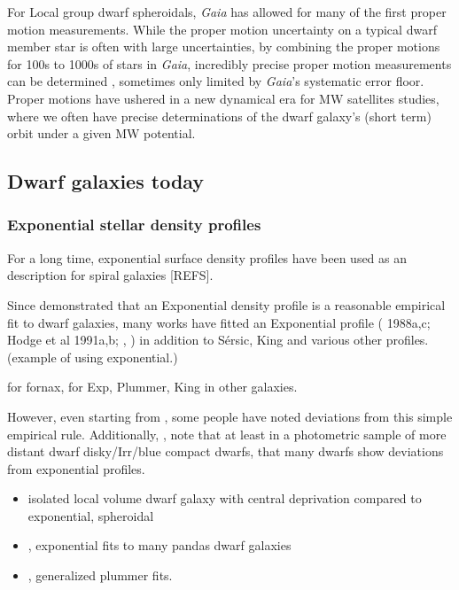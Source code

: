 For Local group dwarf spheroidals, \emph{Gaia} has allowed for many of
the first proper motion measurements. While the proper motion
uncertainty on a typical dwarf member star is often with large
uncertainties, by combining the proper motions for 100s to 1000s of
stars in \emph{Gaia}, incredibly precise proper motion measurements can
be determined \citep[e.g.][]{MV2020a}, sometimes only limited by
\emph{Gaia}'s systematic error floor. Proper motions have ushered in a
new dynamical era for MW satellites studies, where we often have precise
determinations of the dwarf galaxy's (short term) orbit under a given MW
potential.

\subsection{Dwarf galaxies today}\label{dwarf-galaxies-today}

\subsubsection{Exponential stellar density
profiles}\label{exponential-stellar-density-profiles}

For a long time, exponential surface density profiles have been used as
an description for spiral galaxies {[}REFS{]}.

Since \citet{faber+lin1983} demonstrated that an Exponential density
profile is a reasonable empirical fit to dwarf galaxies, many works have
fitted an Exponential profile (\citet{Eskridge} 1988a,c; Hodge et al
1991a,b; \citet{IH1995}, ) in addition to Sérsic, King and various other
profiles. \citet{lelli+2014} (example of using exponential.)

\citet{wang+2019} for fornax, \citet{mcconnachie+irwin2006} for Exp,
Plummer, King in other galaxies.

However, even starting from \citet{aparicio1997}, some people have noted
deviations from this simple empirical rule. Additionally,
\citet{herrmann+hunter+elmegreen2013},
\citet{herrmann+hunter+elmegreen2016} note that at least in a
photometric sample of more distant dwarf disky/Irr/blue compact dwarfs,
that many dwarfs show deviations from exponential profiles.

\begin{itemize}
\tightlist
\item
  \citet{makarov+2012} isolated local volume dwarf galaxy with central
  deprivation compared to exponential, spheroidal
\item
  \citet{martin+2016}, exponential fits to many pandas dwarf galaxies
\item
  \citet{moskowitz+walker2020}, generalized plummer fits.
\end{itemize}

